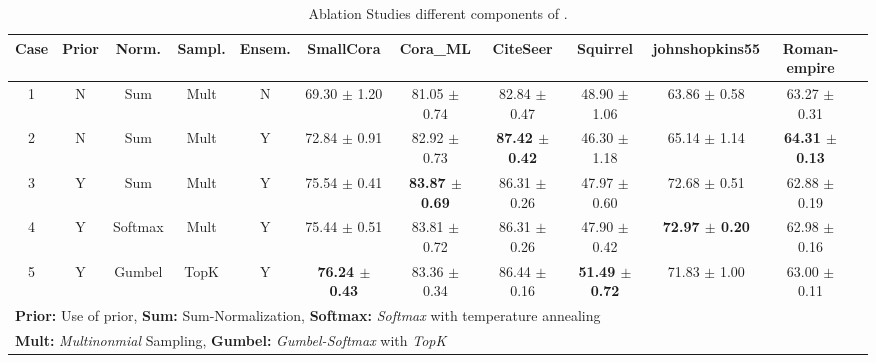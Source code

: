 \begin{table}[t]
\caption{Ablation Studies different components of \sgs.}
\label{tab:ablation}
\centering
\begin{sc}
\resizebox{1.0\linewidth}{!}
{
\def\arraystretch{1.0}
\begin{tabular}{@{}cccccc|cccccc@{}}
\toprule
\textbf{Case} & \textbf{Prior} & \textbf{Norm.} & \textbf{Sampl.}  & \multicolumn{1}{c|}{\textbf{Ensem.}} & \textbf{SmallCora} & \textbf{Cora\_ML} & \textbf{CiteSeer} & \textbf{Squirrel} & \textbf{johnshopkins55} & \textbf{Roman-empire} \\ \midrule
1 & N  & Sum & Mult  & \multicolumn{1}{c|}{N} & 69.30 $\pm$ 1.20 & 81.05 $\pm$ 0.74 & 82.84 $\pm$ 0.47 & 48.90 $\pm$ 1.06 & 63.86 $\pm$ 0.58 & 63.27 $\pm$ 0.31 \\
2 & N  & Sum & Mult  & \multicolumn{1}{c|}{Y} & 72.84 $\pm$ 0.91 & 82.92 $\pm$ 0.73 & \textbf{87.42 $\pm$ 0.42} & 46.30 $\pm$ 1.18 & 65.14 $\pm$ 1.14 & \textbf{64.31 $\pm$ 0.13} \\
3 & Y  & Sum & Mult & \multicolumn{1}{c|}{Y} & 75.54 $\pm$ 0.41 & \textbf{83.87 $\pm$ 0.69} & 86.31 $\pm$ 0.26 & 47.97 $\pm$ 0.60 & 72.68 $\pm$ 0.51 & 62.88 $\pm$ 0.19 \\
4 & Y & Softmax & Mult & \multicolumn{1}{c|}{Y} & 75.44 $\pm$ 0.51 & 83.81 $\pm$ 0.72 & 86.31 $\pm$ 0.26 & 47.90 $\pm$ 0.42 & \textbf{72.97 $\pm$ 0.20} & 62.98 $\pm$ 0.16 \\
5 & Y & Gumbel & TopK & \multicolumn{1}{c|}{Y} & \textbf{76.24 $\pm$ 0.43} & 83.36 $\pm$ 0.34 & 86.44 $\pm$ 0.16 & \textbf{51.49 $\pm$ 0.72} & 71.83 $\pm$ 1.00 & 63.00 $\pm$ 0.11 \\ \midrule
\multicolumn{11}{l}{\textbf{Prior:} Use of prior, \textbf{Sum:} Sum-Normalization, \textbf{Softmax:} \textit{Softmax} with temperature annealing}\\
\multicolumn{11}{l}{\textbf{Mult:} \textit{Multinonmial} Sampling, \textbf{Gumbel:} \textit{Gumbel-Softmax} with \textit{TopK}}\\
\end{tabular}
}
\end{sc}
\end{table}
